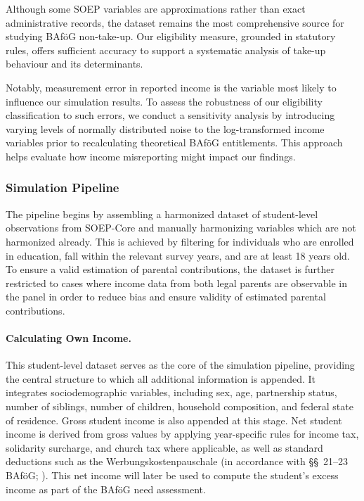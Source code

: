 Although some SOEP variables are approximations rather than exact administrative records, the dataset remains the most comprehensive source for studying BAföG non-take-up. 
Our eligibility measure, grounded in statutory rules, offers sufficient accuracy to support a systematic analysis of take-up behaviour and its determinants.

Notably, measurement error in reported income is the variable most likely to influence our simulation results. 
To assess the robustness of our eligibility classification to such errors, we conduct a sensitivity analysis by introducing varying levels of normally distributed noise to the log-transformed income variables prior to recalculating theoretical BAföG entitlements. This approach helps evaluate how income misreporting might impact our findings.


\subsubsection{Simulation Pipeline}
The pipeline begins by assembling a harmonized dataset of student-level observations from SOEP-Core and manually harmonizing variables which are not harmonized already.
This is achieved by filtering for individuals who are enrolled in education, fall within the relevant survey years, and are at least 18 years old. 
To ensure a valid estimation of parental contributions, the dataset is further restricted to cases where income data from both legal parents are observable in the panel in order to reduce bias and ensure validity of estimated parental contributions.

\paragraph{Calculating Own Income.} 
This student-level dataset serves as the core of the simulation pipeline, providing the central structure to which all additional information is appended. 
It integrates sociodemographic variables, including sex, age, partnership status, number of siblings, number of children, household composition, and federal state of residence. 
Gross student income is also appended at this stage. 
Net student income is derived from gross values by applying year-specific rules for income tax, solidarity surcharge, and church tax where applicable, as well as standard deductions such as the Werbungskostenpauschale (in accordance with §§~21–23 BAföG; \citep{bafoeg_law}). 
This net income will later be used to compute the student’s excess income as part of the BAföG need assessment.

